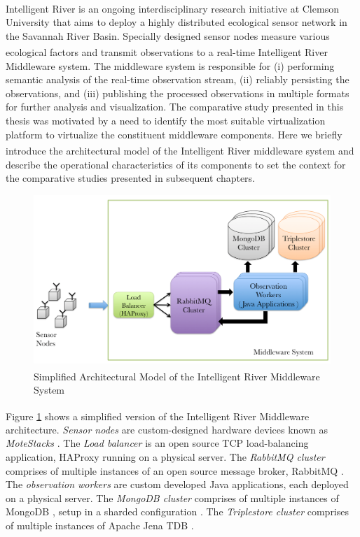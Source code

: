 Intelligent River\textsuperscript{\textregistered} is an ongoing interdisciplinary research initiative at Clemson University that aims to deploy a highly distributed ecological sensor network in the Savannah River Basin. Specially designed sensor nodes measure various ecological factors and transmit observations to a real-time Intelligent River\textsuperscript{\textregistered} Middleware system. The middleware system is responsible for (i) performing semantic analysis of the real-time observation stream, (ii) reliably persisting the observations, and (iii) publishing the processed observations in multiple formats for further analysis and visualization. The comparative study presented in this thesis was motivated by a need to identify the most suitable virtualization platform to virtualize the constituent middleware components. Here we briefly  introduce the architectural model of the Intelligent River\textsuperscript{\textregistered} middleware system and describe the operational characteristics of its components to set the context for the comparative studies presented in subsequent chapters.

\begin{figure}[htbp]
\centering
\includegraphics[width=130mm]{ir.png}
\caption{Simplified Architectural Model of the Intelligent River\textsuperscript{\textregistered} Middleware System}
\label{fig:ir}
\end{figure}

Figure \ref{fig:ir} shows a simplified version of the Intelligent River\textsuperscript{\textregistered} Middleware architecture. \emph{Sensor nodes} are custom-designed hardware devices known as \emph{MoteStacks} \cite{ir}. The \emph{Load balancer} is an open source TCP load-balancing application, HAProxy \cite{haproxy} running on a physical server. The \emph{RabbitMQ cluster} comprises of multiple instances of an open source message broker, RabbitMQ \cite{rabbitmq}. The \emph{observation workers} are custom developed Java applications, each deployed on a physical server. The \emph{MongoDB cluster} comprises of multiple instances of MongoDB \cite{mongodb}, setup in a sharded configuration \cite{mongosharding}. The \emph{Triplestore cluster} comprises of multiple instances of Apache Jena TDB \cite{jenatdb}.

